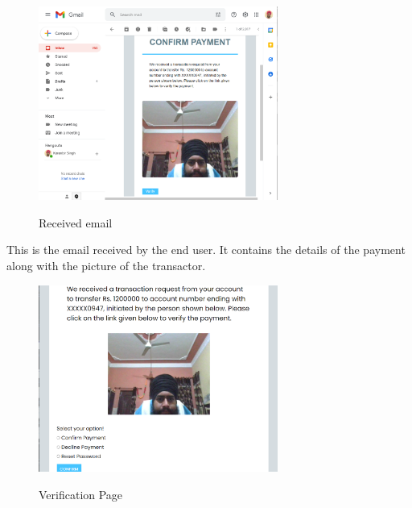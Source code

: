 \documentclass[12pt, oneside, a4paper]{article}
\begin{document}
\vspace{0.7cm}

\begin{figure}[H]
\begin{center}
\includegraphics[width=0.7\textwidth]{Email.png}\\
\caption{Received email}
\label{fig:Figure 10}
\end{center}
\end{figure}

This is the email received by the end user. It contains the details of the payment along with the picture of the transactor.

\pagebreak

\begin{figure}[H]
\begin{center}
\includegraphics[width=0.7\textwidth]{Verify.png}\\
\caption{Verification Page}
\label{fig:Figure 11}
\end{center}
\end{figure}
\end{document}
